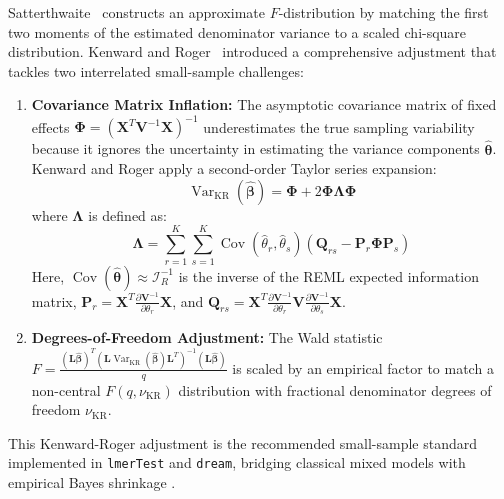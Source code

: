 \documentclass[11pt,twoside,openright]{book}
\begin{document}
Satterthwaite~\cite{satterthwaite1946approximate} constructs an approximate $F$-distribution by matching the first two moments of the estimated denominator variance to a scaled chi-square distribution. Kenward and Roger~\cite{kenward1997small} introduced a comprehensive adjustment that tackles two interrelated small-sample challenges:
\begin{enumerate}
    \item \textbf{Covariance Matrix Inflation:} The asymptotic covariance matrix of fixed effects $\boldsymbol{\Phi} = (\mathbf{X}^T \mathbf{V}^{-1} \mathbf{X})^{-1}$ underestimates the true sampling variability because it ignores the uncertainty in estimating the variance components $\hat{\boldsymbol{\theta}}$. Kenward and Roger apply a second-order Taylor series expansion:
    \begin{equation}
    \label{eq:kr_cov}
    \operatorname{Var}_{\text{KR}}(\hat{\boldsymbol{\beta}}) = \boldsymbol{\Phi} + 2 \boldsymbol{\Phi} \boldsymbol{\Lambda} \boldsymbol{\Phi}
    \end{equation}
    where $\boldsymbol{\Lambda}$ is defined as:
    \begin{equation}
    \label{eq:kr_lambda}
    \boldsymbol{\Lambda} = \sum_{r=1}^K \sum_{s=1}^K \operatorname{Cov}(\hat{\theta}_r, \hat{\theta}_s) \left( \mathbf{Q}_{rs} - \mathbf{P}_r \boldsymbol{\Phi} \mathbf{P}_s \right)
    \end{equation}
    Here, $\operatorname{Cov}(\hat{\boldsymbol{\theta}}) \approx \mathcal{I}_R^{-1}$ is the inverse of the REML expected information matrix, $\mathbf{P}_r = \mathbf{X}^T \frac{\partial \mathbf{V}^{-1}}{\partial \theta_r} \mathbf{X}$, and $\mathbf{Q}_{rs} = \mathbf{X}^T \frac{\partial \mathbf{V}^{-1}}{\partial \theta_r} \mathbf{V} \frac{\partial \mathbf{V}^{-1}}{\partial \theta_s} \mathbf{X}$.
    \item \textbf{Degrees-of-Freedom Adjustment:} The Wald statistic $F = \frac{(\mathbf{L}\hat{\boldsymbol{\beta}})^T (\mathbf{L} \operatorname{Var}_{\text{KR}}(\hat{\boldsymbol{\beta}}) \mathbf{L}^T)^{-1} (\mathbf{L}\hat{\boldsymbol{\beta}})}{q}$ is scaled by an empirical factor to match a non-central $F(q, \nu_{\text{KR}})$ distribution with fractional denominator degrees of freedom $\nu_{\text{KR}}$.
\end{enumerate}
This Kenward-Roger adjustment is the recommended small-sample standard implemented in \texttt{lmerTest} and \texttt{dream}, bridging classical mixed models with empirical Bayes shrinkage \cite{smyth2004linear, ritchie2015limma, hoffman2021dream, kuznetsova2017lmertest}.
\end{document}
